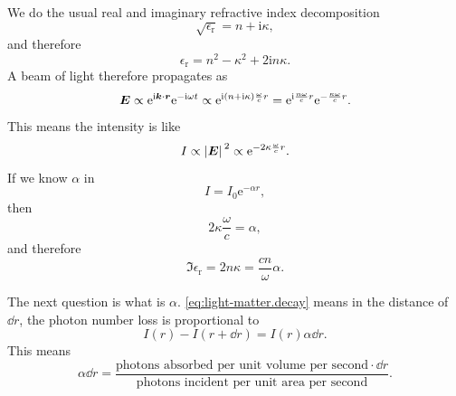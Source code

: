 \documentclass[hyperref, a4paper, 12pt]{report}
\newcommand*{\ii}{\mathrm{i}}
\newcommand*{\ee}{\mathrm{e}}
\newcommand*{\epsr}{\epsilon_{\text{r}}}
\begin{document}
We do the usual real and imaginary refractive index decomposition
\begin{equation}
    \sqrt{\epsr} = n + \ii \kappa,
\end{equation}
and therefore 
\begin{equation}
    \epsr = n^2 - \kappa^2 + 2 \ii n \kappa .
\end{equation}
A beam of light therefore propagates as 
\begin{equation}
    \vb*{E} \propto \ee^{\ii \vb*{k} \cdot \vb*{r}} \ee^{- \ii \omega t}
    \propto \ee^{\ii (n + \ii \kappa) \frac{\omega}{c} r} 
    = \ee^{\ii \frac{n \omega}{c} r} \ee^{- \frac{\kappa \omega}{c} r}.
    \label{eq:light-propagating}
\end{equation}
This means the intensity is like 
\[
    I \propto \abs*{\vb*{E}}^2 \propto \ee^{- 2 \kappa \frac{\omega}{c} r}.
\]
If we know $\alpha$  in
\begin{equation}
    I = I_0 \ee^{- \alpha r}, 
    \label{eq:light-matter.decay}
\end{equation}
then 
\[
    2 \kappa \frac{\omega}{c} = \alpha,
\]
and therefore 
\begin{equation}
    \Im \epsr = 2 n \kappa = \frac{c n}{\omega} \alpha.
    \label{eq:imaginary-epsilon-alpha}
\end{equation}

The next question is what is $\alpha$. 
\eqref{eq:light-matter.decay} means in the distance of $\dd{r}$, 
the photon number loss is proportional to
\[
    I(r) - I(r + \dd{r}) = I(r) \alpha \dd{r}.
\] 
This means 
\begin{equation}
    \alpha \dd{r} = \frac{
        \text{photons absorbed per unit volume per second} \cdot \dd{r}
    }{
        \text{photons incident per unit area per second}
    }.
\end{equation}
\end{document}

